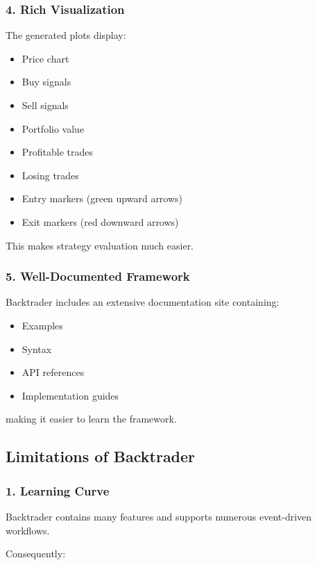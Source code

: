 \documentclass[12pt,openany]{book}
\begin{document}
\subsubsection{4. Rich Visualization}

The generated plots display:

\begin{itemize}[leftmargin=*]
    \item Price chart
    \item Buy signals
    \item Sell signals
    \item Portfolio value
    \item Profitable trades
    \item Losing trades
    \item Entry markers (green upward arrows)
    \item Exit markers (red downward arrows)
\end{itemize}

This makes strategy evaluation much easier.

\subsubsection{5. Well-Documented Framework}

Backtrader includes an extensive documentation site containing:

\begin{itemize}[leftmargin=*]
    \item Examples
    \item Syntax
    \item API references
    \item Implementation guides
\end{itemize}

making it easier to learn the framework.

\subsection{Limitations of Backtrader}

\subsubsection{1. Learning Curve}

Backtrader contains many features and supports numerous event-driven workflows.

Consequently:
\end{document}
